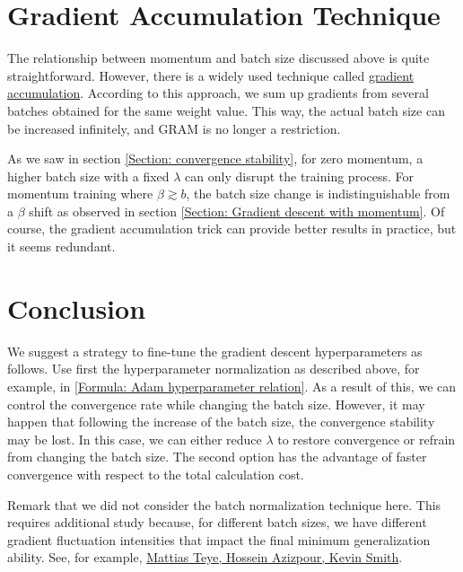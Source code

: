 \documentclass[12pt,a4paper]{amsart}
\numberwithin{equation}{section}
\theoremstyle{remark}
\begin{document}
\section{Gradient Accumulation Technique}

The relationship between momentum and batch size discussed above is quite straightforward.
However, there is a widely used technique called
\href{https://towardsdatascience.com/what-is-gradient-accumulation-in-deep-learning-ec034122cfa}
{gradient accumulation}.
According to this approach,
we sum up gradients from several batches obtained for the same weight value.
This way, the actual batch size can be increased infinitely, and GRAM is no longer a restriction.

As we saw in section
\ref{Section: convergence stability},
for zero momentum, a higher batch size with a fixed
$\lambda$
can only disrupt the training process.
For momentum training where
$\beta \gtrsim b$,
the batch size change is indistinguishable from a
$\beta$
shift as observed in section
\ref{Section: Gradient descent with momentum}.
Of course, the gradient accumulation trick can provide better results in practice,
but it seems redundant.


\section{Conclusion}

We suggest a strategy to fine-tune the gradient descent hyperparameters as follows.
Use first the hyperparameter normalization as described above, for example, in
\eqref{Formula: Adam hyperparameter relation}.
As a result of this, we can control the convergence rate while changing the batch size.
However, it may happen that following the increase of the batch size,
the convergence stability may be lost.
In this case, we can either reduce
$\lambda$
to restore convergence or refrain from changing the batch size.
The second option has the advantage of faster convergence
with respect to the total calculation cost.

Remark that we did not consider the batch normalization technique here.
This requires additional study because, for different batch sizes,
we have different gradient fluctuation intensities
that impact the final minimum generalization ability.
See, for example,
\href{https://arxiv.org/pdf/1802.06455.pdf}{Mattias Teye, Hossein Azizpour, Kevin Smith}.
\end{document}
